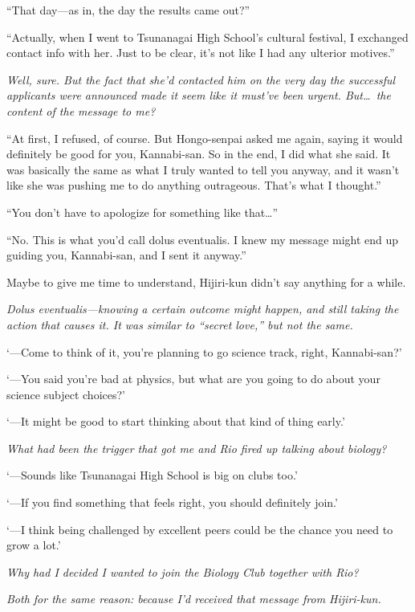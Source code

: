 \documentclass[
    a4paper,
    12pt,
    twoside,
    openany,
    UTF8,
    fontset=windows
]{ctexbook}
\begin{document}
``That day---as in, the day the results came out?''

``Actually, when I went to Tsunanagai High School's cultural festival, I exchanged contact info with her. Just to be clear, it's not like I had any ulterior motives.''

\textit{Well, sure. But the fact that she'd contacted him on the very day the successful applicants were announced made it seem like it must've been urgent. But\dots\ the content of the message to me?}

``At first, I refused, of course. But Hongo-senpai asked me again, saying it would definitely be good for you, Kannabi-san. So in the end, I did what she said. It was basically the same as what I truly wanted to tell you anyway, and it wasn't like she was pushing me to do anything outrageous. That's what I thought.''

``You don't have to apologize for something like that\dots''

``No. This is what you'd call dolus eventualis. I knew my message might end up guiding you, Kannabi-san, and I sent it anyway.''

Maybe to give me time to understand, Hijiri-kun didn't say anything for a while.

\textit{Dolus eventualis---knowing a certain outcome might happen, and still taking the action that causes it. It was similar to ``secret love,'' but not the same.}

`---Come to think of it, you're planning to go science track, right, Kannabi-san?'

`---You said you're bad at physics, but what are you going to do about your science subject choices?'

`---It might be good to start thinking about that kind of thing early.'

\textit{What had been the trigger that got me and Rio fired up talking about biology?}

`---Sounds like Tsunanagai High School is big on clubs too.'

`---If you find something that feels right, you should definitely join.'

`---I think being challenged by excellent peers could be the chance you need to grow a lot.'

\textit{Why had I decided I wanted to join the Biology Club together with Rio?}

\textit{Both for the same reason: because I'd received that message from Hijiri-kun.}
\end{document}
